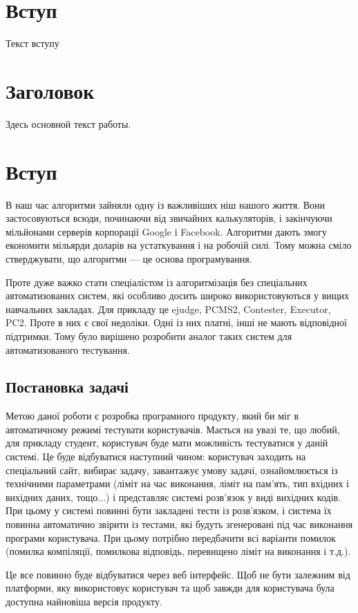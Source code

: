 




\fontsize{14}{14pt}\selectfont

\maketitle


\tableofcontents


\section*{Вступ}
Текст вступу

\section{Заголовок}
Здесь основной текст работы\cite{BookRef, ArticleRef, LinkRef}.


\section{Вступ}
В наш час алгоритми зайняли одну із важливіших ніш нашого життя. Вони застосовуються всюди, починаючи від звичайних калькуляторів, і закінчуючи мільйонами серверів корпорації Google і  Facebook. Алгоритми дають змогу економити мільярди доларів на устаткування і на робочій силі. Тому можна сміло стверджувати, що алгоритми --- це основа програмування.
\par Проте дуже важко стати спеціалістом із алгоритмізація без спеціальних автоматизованих систем, які особливо досить широко використовуються у вищих навчальних закладах. Для прикладу це ejudge, PCMS2, Contester, Executor, PC2. Проте в них є свої недоліки. Одні із них платні, інші не мають відповідної підтримки. Тому було вирішено розробити аналог таких систем для автоматизованого тестування.

\subsection{Постановка задачі}
Метою даної роботи є розробка програмного продукту, який би міг в автоматичному режимі тестувати користувачів. Мається на увазі те, що любий, для прикладу студент, користувач буде мати можливість тестуватися у даній системі. Це буде відбуватися наступний чином: користувач заходить на спеціальний сайт, вибирає задачу, завантажує умову задачі, ознайомлюється із технічними параметрами (ліміт на час виконання, ліміт на пам'ять, тип вхідних і вихідних даних, тощо...) і представляє системі розв'язок у виді вихідних кодів. При цьому у системі повинні бути закладені тести із розв'язком, і система їх повинна автоматично звірити із тестами, які будуть згенеровані під час виконання програми користувача. При цьому потрібно передбачити всі варіанти помилок (помилка компіляції, помилкова відповідь, перевищено ліміт на виконання і т.д.). 
\par Це все повинно буде відбуватися через веб інтерфейс. Щоб не бути залежним від платформи, яку використовує користувач та щоб завжди для користувача була доступна найновіша версія продукту.



